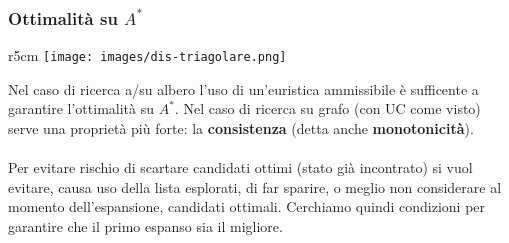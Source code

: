 \subsubsection{Ottimalità su $A^*$}
\begin{wrapfigure}[8]{r}{5cm}
    \vspace{-30pt}
    \centering
    \texttt{[image: images/dis-triagolare.png]}
\end{wrapfigure}
Nel caso di ricerca a/su albero l'uso di un'euristica ammissibile è sufficente a garantire l'ottimalità su $A^*$.
Nel caso di ricerca su grafo (con UC come visto) serve una proprietà più forte: la \textbf{consistenza} (detta anche \textbf{monotonicità}).\\\\
Per evitare rischio di scartare candidati ottimi (stato già incontrato) si vuol evitare, causa uso della lista esplorati, di far sparire, o meglio
non considerare al momento dell'espansione, candidati ottimali. Cerchiamo quindi condizioni per garantire che il primo espanso sia il migliore.

